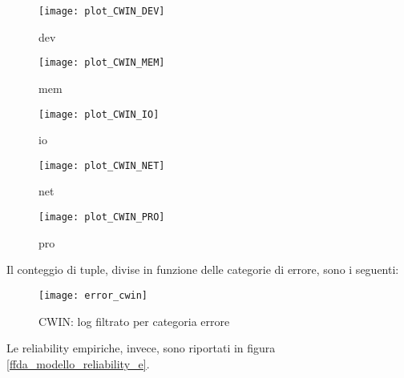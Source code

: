 \begin{minipage}{\linewidth}
  \centering
  \begin{minipage}{0.49\linewidth}
    \begin{figure}[H]
      \texttt{[image: plot\_CWIN\_DEV]}
      \caption*{dev}
    \end{figure}
  \end{minipage}
  \begin{minipage}{0.49\linewidth}
    \begin{figure}[H]
      \texttt{[image: plot\_CWIN\_MEM]}
      \caption*{mem}
    \end{figure}
  \end{minipage}
  \begin{minipage}{0.49\linewidth}
    \begin{figure}[H]
      \texttt{[image: plot\_CWIN\_IO]}
      \caption*{io}
    \end{figure}
  \end{minipage}
  \begin{minipage}{0.49\linewidth}
    \begin{figure}[H]
      \texttt{[image: plot\_CWIN\_NET]}
      \caption*{net}
    \end{figure}
  \end{minipage}
  \begin{minipage}{0.49\linewidth}
    \hspace{0.25\linewidth}
    \begin{figure}[H]
      \texttt{[image: plot\_CWIN\_PRO]}
      \caption*{pro}
    \end{figure}
  \end{minipage}
\end{minipage}
\label{ffda_cwin_categorie}

\clearpage

Il conteggio di tuple, divise in funzione delle categorie di errore, sono i
seguenti:

\begin{figure}[!htbp]
  \centering
  \texttt{[image: error\_cwin]}
  \caption{CWIN: log filtrato per categoria errore}
  \label{ffda_error_cwin}
\end{figure}

\clearpage

Le reliability empiriche, invece, sono riportati in figura \ref{ffda_modello_reliability_e}.\\


